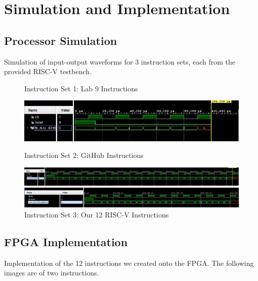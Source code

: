 \documentclass{article}
\begin{document}
\section{Simulation and Implementation}
\subsection{Processor Simulation}
Simulation of input-output waveforms for 3 instruction sets, each from the provided RISC-V testbench.

\begin{figure}[htp]
  \centering
  \caption{Instruction Set 1: Lab 9 Instructions}
    \includegraphics[width=\textwidth, keepaspectratio]{Lab9Instr.jpg}

  \centering
  \caption{Instruction Set 2: GitHub Instructions}
    \includegraphics[width=\textwidth, keepaspectratio]{GitHubInstr.jpg}

    \centering
      \caption{Instruction Set 3: Our 12 RISC-V Instructions}
    \includegraphics[width=\textwidth, keepaspectratio]{Um12Instr.jpg}
\end{figure}

\subsection{FPGA Implementation} 
Implementation of the 12 instructions we created onto the FPGA. The following images are of two instructions.
\end{document}
